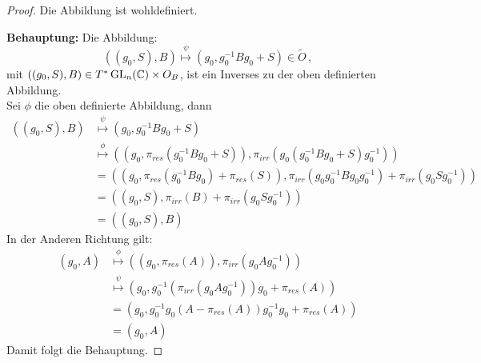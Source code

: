 \begin{proof}
Die Abbildung ist wohldefiniert.
\begin{comment}
denn??
\end{comment}
\textbf{Behauptung:} Die Abbildung:
\[
((g_0,S),B)\overset\psi\mapsto(g_0,g_0^{-1}Bg_0+S)\in\tilde O \,,
\]
mit $((g_0,S),B)\in T^*\operatorname{GL}_n(\mathbb{C})\times O_B$, ist ein Inverses zu der oben
definierten Abbildung.\\
Sei $\phi$ die oben definierte Abbildung, dann
\begin{align*}
((g_0,S),B)&\overset\psi\mapsto(g_0,g_0^{-1}Bg_0+S)
\\&\overset\phi\mapsto((g_0,\pi_{res}(g_0^{-1}Bg_0+S)),
    \pi_{irr}(g_0(g_0^{-1}Bg_0+S)g_0^{-1}))
\\&=((g_0,\pi_{res}(g_0^{-1}Bg_0)+\pi_{res}(S)),
    \pi_{irr}( g_0g_0^{-1}Bg_0g_0^{-1})+\pi_{irr}(g_0Sg_0^{-1}))
\\&=((g_0,S), \pi_{irr}(B)+ \pi_{irr}(g_0Sg_0^{-1}))
\\&=((g_0,S), B)
\end{align*}
In der Anderen Richtung gilt:
\begin{align*}
(g_0,A)&\overset\phi\mapsto ((g_0,\pi_{res}(A)),\pi_{irr}(g_0Ag_0^{-1}))
\\&\overset\psi\mapsto (g_0,g_0^{-1}(\pi_{irr}(g_0Ag_0^{-1}))g_0+\pi_{res}(A))
\\&= (g_0,g_0^{-1}g_0(A - \pi_{res}(A))g_0^{-1}g_0+\pi_{res}(A))
\\&= (g_0,A)
\end{align*}
Damit folgt die Behauptung.
\end{proof}

